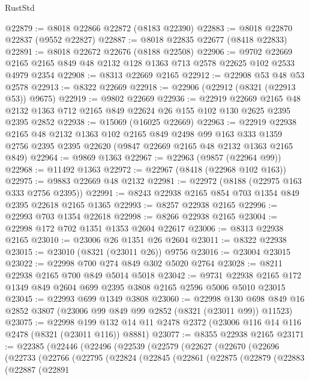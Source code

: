 \begin{lexlean}{RustStd}
\begin{coremodule}
@22879 := @8018 @22866 @22872 (@8183 @22390)
@22883 := @8018 @22870 @22837 (@9552 @22827)
@22887 := @8018 @22835 @22677 (@8418 @22833)
@22891 := @8018 @22672 @22676 (@8188 @22508)
@22906 := @9702
    @22669
    @2165
    @2165
    @849
    @48
    @2132
    @128
    @1363
    @713
    @2578
    @22625
    @102
    @2533
    @4979
    @2354
@22908 := @8313 @22669 @2165
@22912 := @22908 @53 @48 @53 @2578
@22913 := @8322 @22669
@22918 := @22906 (@22912 (@8321 (@22913 @53)) @9675)
@22919 := @9802 @22669
@22936 := @22919
    @22669
    @2165
    @48
    @2132
    @1363
    @712
    @2165
    @849
    @22624
    @26
    @155
    @102
    @130
    @2625
    @2395
    @2395
    @2852
@22938 := @15069 (@16025 @22669)
@22963 := @22919
    @22938
    @2165
    @48
    @2132
    @1363
    @102
    @2165
    @849
    @2498
    @99
    @163
    @333
    @1359
    @2756
    @2395
    @2395
    @22620
    (@9847 @22669 @2165 @48 @2132 @1363 @2165 @849)
@22964 := @9869 @1363
@22967 := @22963 (@9857 (@22964 @99))
@22968 := @11492 @1363
@22972 := @22967 (@8418 (@22968 @102 @163))
@22975 := @9883 @22669 @48 @2132
@22981 := @22972 (@8188 (@22975 @163 @333 @2756 @2395))
@22991 := @8243 @22938 @2165 @854 @703 @1354 @849 @2395 @22618 @2165 @1365
@22993 := @8257 @22938 @2165
@22996 := @22993 @703 @1354 @22618
@22998 := @8266 @22938 @2165
@23004 := @22998 @172 @702 @1351 @1353 @2604 @22617
@23006 := @8313 @22938 @2165
@23010 := @23006 @26 @1351 @26 @2604
@23011 := @8322 @22938
@23015 := @23010 (@8321 (@23011 @26)) @9756
@23016 := @23004 @23015
@23022 := @22998 @700 @274 @849 @302 @5020 @2764
@23028 := @8211 @22938 @2165 @700 @849 @5014 @5018
@23042 := @9731 @22938 @2165 @172 @1349 @849 @2604 @699 @2395 @3808 @2165 @2596 @5006 @5010 @23015
@23045 := @22993 @699 @1349 @3808
@23060 := @22998
    @130
    @698
    @849
    @16
    @2852
    @3807
    (@23006 @99 @849 @99 @2852 (@8321 (@23011 @99)) @11523)
@23075 := @22998
    @199
    @132
    @14
    @11
    @2478
    @2372
    (@23006 @116 @14 @116 @2478 (@8321 (@23011 @116)) @8881)
@23077 := @8355 @22938 @2165
@23171 := @22385
    (@22446
      (@22496
        (@22539
          (@22579
            (@22627
              (@22670
                (@22696
                  (@22733
                    (@22766
                      (@22795
                        (@22824
                          (@22845
                            (@22861
                              (@22875
                                (@22879
                                  (@22883
                                    (@22887
                                      (@22891

\end{coremodule}
\end{lexlean}
